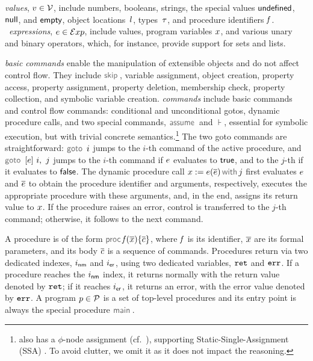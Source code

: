 \vspace{5pt}
\noindent \jsil \emph{values}, $v \in \mathcal{V}$, include numbers, booleans, strings, the special values ${\sf undefined}$, ${\sf null}$, and ${\sf empty}$, object locations~$l$, types~$\tau$, and procedure identifiers $\mathit{f}$.
\jsil~\emph{expressions}, $e \in \mathcal{E}xp$, include \jsil values, \jsil program variables $x$, and various unary and binary operators, which, for instance, provide support for sets and lists. 

\jsil \emph{basic commands} enable the manipulation of extensible objects and do not affect control flow. 
They include $\jsilskip$, variable assignment, object creation, property access, property assignment, property deletion, membership check,  property collection, and symbolic variable creation. 
%
\jsil \emph{commands} include \jsil basic commands and control flow commands: conditional and unconditional gotos, dynamic procedure calls, and two special commands, $\assume$ and $\assert$, essential for symbolic execution, but with trivial concrete semantics.\footnote{\jsil also has a $\phi$-node assignment (cf.~\cite{javert}), supporting Static-Single-Assignment (SSA) \cite{SSA}. To avoid clutter, we omit it as it does not impact the reasoning.} 
The two goto commands are straightforward: $\goto \ i$ jumps to the $i$-th command of the active procedure, and $\ifgoto{\jsilexpr}{i}{j}$ jumps to the $i$-th command if $e$ evaluates to ${\sf true}$, and to the $j$-th if it evaluates to ${\sf false}$. 
The dynamic procedure call $\jsilcall{\jvar}{\jsilexpr}{\jvec{\jsilexpr}}{j}$ first evaluates  $e$ and $\overline{e}$ to obtain the procedure identifier and arguments, respectively, executes the appropriate procedure with these arguments, and, in the end, assigns its return value to $x$.
If the procedure raises an error, control is transferred to the $j$-th command; otherwise, it follows to the next command. 

A \jsil procedure is of the form $\procedure{\pid}{\jvec{\jvar}}{\jvec{\jcmd}}$, where $\mathit{f}$ is its identifier, $\overline{x}$ are its formal parameters, and its body ${\overline{c}}$  is a sequence of \jsil commands. Procedures return via two dedicated indexes, $i_{{\sf nm}}$ and $i_{{\sf er}}$, using two dedicated variables, $\mathtt{ret}$ and $\mathtt{err}$. If a procedure reaches the $i_{{\sf nm}}$ index, it returns normally with the return value denoted by $\mathtt{ret}$; if it reaches $i_{{\sf er}}$, it returns an error, with the error value denoted by $\mathtt{err}$.
A \jsil program $p \in \mathcal{P}$ is a set of top-level procedures and its entry point is always the special procedure $\jsilmain$\hspace{-2pt}.


